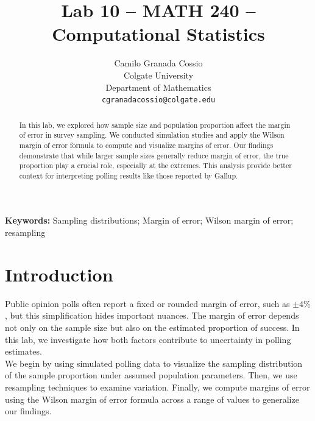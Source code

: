 \documentclass{article}\usepackage[]{graphicx}\usepackage[]{xcolor}
\begin{document}
\vspace{-1in}
\title{Lab 10 -- MATH 240 -- Computational Statistics}

\author{
  Camilo Granada Cossio \\
  Colgate University  \\
  Department of Mathematics  \\
  {\tt cgranadacossio@colgate.edu}
}

\date{}

\maketitle

\begin{multicols}{2}
\begin{abstract}

In this lab, we explored how sample size and population proportion affect the margin of error in survey sampling. We conducted simulation studies and apply the Wilson margin of error formula to compute and visualize margins of error. Our findings demonstrate that while larger sample sizes generally reduce margin of error, the true proportion play a crucial role, especially at the extremes. This analysis provide better context for interpreting polling results like those reported by Gallup.

\end{abstract}

\noindent \textbf{Keywords:} Sampling distributions; Margin of error; Wilson margin of error; resampling

\section{Introduction}

Public opinion polls often report a fixed or rounded margin of error, such as  $\pm 4\%$, but this simplification hides important nuances. The margin of error depends not only on the sample size but also on the estimated proportion of success. In this lab, we investigate how both factors contribute to uncertainty in polling estimates.\\

\noindent We begin by using simulated polling data to visualize the sampling distribution of the sample proportion under assumed population parameters. Then, we use resampling techniques to examine variation. Finally, we compute margins of error using the Wilson margin of error formula across a range of values to generalize our findings.


\end{multicols}
\end{document}
